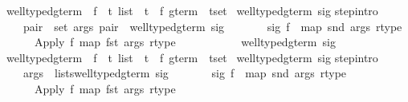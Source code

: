 \begin{isabellebody}
\isanewline
\isanewline
\isamarkupfalse%
\ well{\isacharunderscore}typed{\isacharunderscore}gterm\ {\isacharcolon}{\isacharcolon}\ {\isachardoublequote}{\isacharparenleft}{\isacharprime}f\ {\isasymRightarrow}\ {\isacharprime}t\ list\ {\isacharasterisk}\ {\isacharprime}t{\isacharparenright}\ {\isasymRightarrow}\ {\isacharparenleft}{\isacharprime}f\ gterm\ {\isacharasterisk}\ {\isacharprime}t{\isacharparenright}set{\isachardoublequote}\isanewline
\isamarkupfalse%
\ {\isachardoublequote}well{\isacharunderscore}typed{\isacharunderscore}gterm\ sig{\isachardoublequote}\isanewline
{}\isanewline
step{\isacharbrackleft}intro{\isacharbang}{\isacharbrackright}{\isacharcolon}\ \isanewline
\ \ \ \ {\isachardoublequote}{\isasymlbrakk}{\isasymforall}pair\ {\isasymin}\ set\ args{\isachardot}\ pair\ {\isasymin}\ well{\isacharunderscore}typed{\isacharunderscore}gterm\ sig{\isacharsemicolon}\ \isanewline
\ \ \ \ \ \ sig\ f\ {\isacharequal}\ {\isacharparenleft}map\ snd\ args{\isacharcomma}\ rtype{\isacharparenright}{\isasymrbrakk}\isanewline
\ \ \ \ \ {\isasymLongrightarrow}\ {\isacharparenleft}Apply\ f\ {\isacharparenleft}map\ fst\ args{\isacharparenright}{\isacharcomma}\ rtype{\isacharparenright}\ \isanewline
\ \ \ \ \ \ \ \ \ {\isasymin}\ well{\isacharunderscore}typed{\isacharunderscore}gterm\ sig{\isachardoublequote}\isanewline
\isanewline
\isamarkupfalse%
\ well{\isacharunderscore}typed{\isacharunderscore}gterm{\isacharprime}\ {\isacharcolon}{\isacharcolon}\ {\isachardoublequote}{\isacharparenleft}{\isacharprime}f\ {\isasymRightarrow}\ {\isacharprime}t\ list\ {\isacharasterisk}\ {\isacharprime}t{\isacharparenright}\ {\isasymRightarrow}\ {\isacharparenleft}{\isacharprime}f\ gterm\ {\isacharasterisk}\ {\isacharprime}t{\isacharparenright}set{\isachardoublequote}\isanewline
\isamarkupfalse%
\ {\isachardoublequote}well{\isacharunderscore}typed{\isacharunderscore}gterm{\isacharprime}\ sig{\isachardoublequote}\isanewline
{}\isanewline
step{\isacharbrackleft}intro{\isacharbang}{\isacharbrackright}{\isacharcolon}\ \isanewline
\ \ \ \ {\isachardoublequote}{\isasymlbrakk}args\ {\isasymin}\ lists{\isacharparenleft}well{\isacharunderscore}typed{\isacharunderscore}gterm{\isacharprime}\ sig{\isacharparenright}{\isacharsemicolon}\ \isanewline
\ \ \ \ \ \ sig\ f\ {\isacharequal}\ {\isacharparenleft}map\ snd\ args{\isacharcomma}\ rtype{\isacharparenright}{\isasymrbrakk}\isanewline
\ \ \ \ \ {\isasymLongrightarrow}\ {\isacharparenleft}Apply\ f\ {\isacharparenleft}map\ fst\ args{\isacharparenright}{\isacharcomma}\ rtype{\isacharparenright}\ \isanewline

\end{isabellebody}
